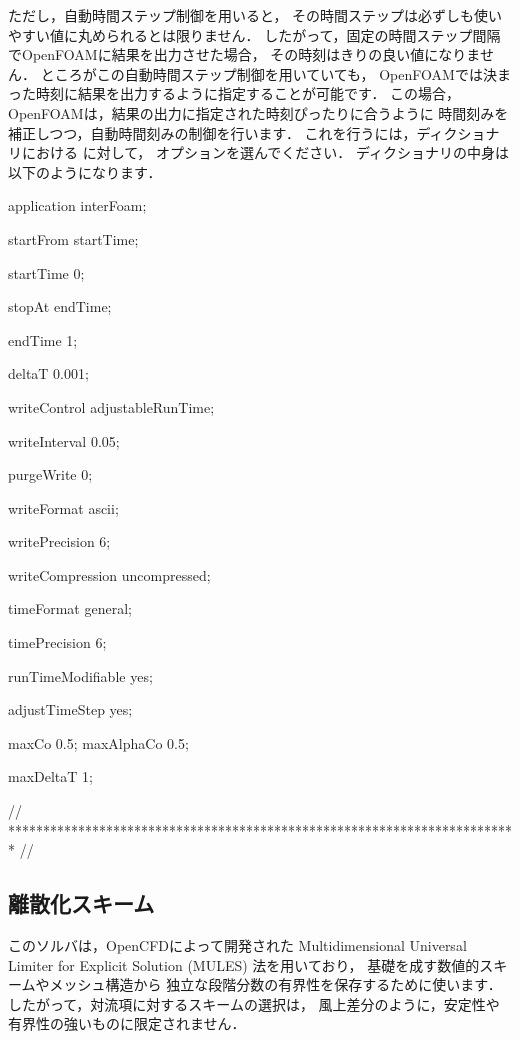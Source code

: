 ただし，自動時間ステップ制御を用いると，
その時間ステップは必ずしも使いやすい値に丸められるとは限りません．
したがって，固定の時間ステップ間隔でOpenFOAMに結果を出力させた場合，
その時刻はきりの良い値になりません．
ところがこの自動時間ステップ制御を用いていても，
OpenFOAMでは決まった時刻に結果を出力するように指定することが可能です．
この場合，OpenFOAMは，結果の出力に指定された時刻ぴったりに合うように
時間刻みを補正しつつ，自動時間刻みの制御を行います．
これを行うには，ディクショナリにおける
%
%
に対して，
%
%
オプションを選んでください．
%
%
ディクショナリの中身は以下のようになります．
\begin{OFverbatim}[file, linenum=17]

application     interFoam;

startFrom       startTime;

startTime       0;

stopAt          endTime;

endTime         1;

deltaT          0.001;

writeControl    adjustableRunTime;

writeInterval   0.05;

purgeWrite      0;

writeFormat     ascii;

writePrecision  6;

writeCompression uncompressed;

timeFormat      general;

timePrecision   6;

runTimeModifiable yes;

adjustTimeStep  yes;

maxCo           0.5;
maxAlphaCo      0.5;

maxDeltaT       1;


// ************************************************************************* //
\end{OFverbatim}


\subsection{離散化スキーム}
\label{ssec:2.3.6}
このソルバは，OpenCFDによって開発された
Multidimensional Universal Limiter for Explicit Solution (MULES) 法を用いており，
基礎を成す数値的スキームやメッシュ構造から
独立な段階分数の有界性を保存するために使います．
したがって，対流項に対するスキームの選択は，
風上差分のように，安定性や有界性の強いものに限定されません．


